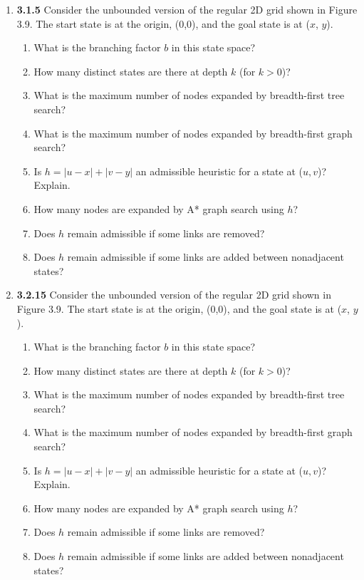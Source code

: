 \documentclass[12pt]{article}
\begin{document}
\begin{enumerate}
\newpage

\item \textbf{3.1.5} Consider the unbounded version of the regular 2D grid shown in Figure 3.9. The start state is at the origin, (0,0), and the goal state is at ($x$, $y$).
  \begin{enumerate}
  \item What is the branching factor $b$ in this state space?
  \item How many distinct states are there at depth $k$ (for $k > 0$)?
  \item What is the maximum number of nodes expanded by breadth-first tree search?
  \item What is the maximum number of nodes expanded by breadth-first graph search?
  \item Is $h = \left|u - x\right| + \left|v - y\right|$ an admissible heuristic for a state at ($u, v$)? Explain.
  \item How many nodes are expanded by A* graph search using $h$?
  \item Does $h$ remain admissible if some links are removed?
  \item Does $h$ remain admissible if some links are added between nonadjacent states?
  \end{enumerate}

\newpage

\item \textbf{3.2.15} Consider the unbounded version of the regular 2D grid shown in Figure 3.9. The start state is at the origin, (0,0), and the goal state is at ($x$, $y$).
  \begin{enumerate}
  \item What is the branching factor $b$ in this state space?
  \item How many distinct states are there at depth $k$ (for $k > 0$)?
  \item What is the maximum number of nodes expanded by breadth-first tree search?
  \item What is the maximum number of nodes expanded by breadth-first graph search?
  \item Is $h = \left|u - x\right| + \left|v - y\right|$ an admissible heuristic for a state at ($u, v$)? Explain.
  \item How many nodes are expanded by A* graph search using $h$?
  \item Does $h$ remain admissible if some links are removed?
  \item Does $h$ remain admissible if some links are added between nonadjacent states?
  \end{enumerate}

\end{enumerate}
\end{document}
